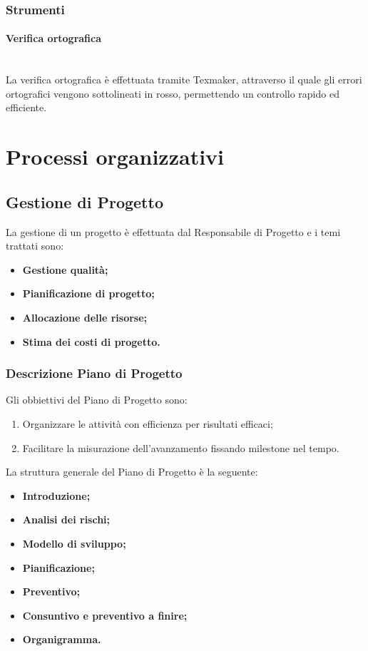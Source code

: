 \documentclass[11pt,a4paper]{article}
\begin{document}
\subsubsection{Strumenti}
\paragraph{Verifica ortografica}
\noindent \\
La verifica ortografica è effettuata tramite Texmaker, attraverso il quale gli errori ortografici vengono sottolineati in rosso, permettendo un controllo rapido ed efficiente.


\newpage
\section{Processi organizzativi}

\subsection{Gestione di Progetto}
La gestione di un progetto è effettuata dal Responsabile di Progetto e i temi trattati sono:
\begin{itemize}
\item \textbf{Gestione qualità;}
\item \textbf{Pianificazione di progetto;}
\item \textbf{Allocazione delle risorse;}
\item \textbf{Stima dei costi di progetto.}
\end{itemize}

\subsubsection{Descrizione Piano di Progetto}

Gli obbiettivi del Piano di Progetto sono:

\begin{enumerate}
\item Organizzare le attività con efficienza per risultati efficaci;
\item Facilitare la misurazione dell'avanzamento fissando milestone nel tempo.
\end{enumerate}

La struttura generale del Piano di Progetto è la seguente:
\begin{itemize}
\item \textbf{Introduzione;}
\item \textbf{Analisi dei rischi;}
\item \textbf{Modello di sviluppo;}
\item \textbf{Pianificazione;}
\item \textbf{Preventivo;}
\item \textbf{Consuntivo e preventivo a finire;}
\item \textbf{Organigramma.}
\end{itemize}
\end{document}
